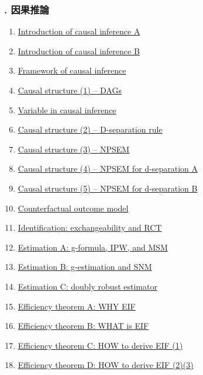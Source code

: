 \documentclass[11pt]{article}
\begin{document}
\vspace{-1cm}

\subsubsection*{. 因果推論}

\vspace{-0.5cm}

\begin{enumerate}
	\item \href{https://mp.weixin.qq.com/s/W92ZurwB0431bOjolErMcQ}{Introduction of causal inference A}	%
	\item \href{https://mp.weixin.qq.com/s/8R9Tew3wshkK_95TIfNQeQ}{Introduction of causal inference B}	%
	\item \href{https://mp.weixin.qq.com/s/2LjJU_2HnIQuVikL2nJGXQ}{Framework of causal inference}	%
	\item \href{https://mp.weixin.qq.com/s/9-aAIHYw7cIScdiZkmyDjg}{Causal structure (1) – DAGs}	%
	\item \href{https://mp.weixin.qq.com/s/3gdqkn7SgzBf1jzQX-cfxw}{Variable in causal inference}	%
	\item \href{https://mp.weixin.qq.com/s/anf-w03I-eiUCfSy7jaYDg}{Causal structure (2) – D-separation rule}	%
	\item \href{https://mp.weixin.qq.com/s/3ko1L3dg_2_z7cvpI02Gsw}{Causal structure (3) – NPSEM}	%
	\item \href{https://mp.weixin.qq.com/s/Mld8h9U1qgeg_myPnbYTbQ}{Causal structure (4) – NPSEM for d-separation A}	%
	\item \href{https://mp.weixin.qq.com/s/ZooQicl91QtUglL867KPsw}{Causal structure (5) – NPSEM for d-separation B}	%
	\item \href{https://mp.weixin.qq.com/s/1s1W5jLFTNFEBXbC1pMNqw}{Counterfactual outcome model}	%
	\item \href{https://mp.weixin.qq.com/s/L0rovGlXJF78IuaPsQBb4g}{Identification: exchangeability and RCT}	%
	\item \href{https://mp.weixin.qq.com/s/czrPh4QeGfloK0C8HwkDoA}{Estimation A: g-formula, IPW, and MSM}	%
	\item \href{https://mp.weixin.qq.com/s/VhO4AD5lIPQtHEbFsDBKSw}{Estimation B: g-estimation and SNM}	%
	\item \href{https://mp.weixin.qq.com/s/byaU2Ja7p2fipSJBPZhFhw}{Estimation C: doubly robust estimator}	%
	\item \href{https://mp.weixin.qq.com/s/K68QFvy2kBbAZg7P0mipeA}{Efficiency theorem A: WHY EIF}	%
	\item \href{https://mp.weixin.qq.com/s/tVgr9wOWmP8Uuami5H_PkA}{Efficiency theorem B: WHAT is EIF}	%
	\item \href{https://mp.weixin.qq.com/s/VtDcsaEEdxR1yZmdz9eB-g}{Efficiency theorem C: HOW to derive EIF (1)}	%
	\item \href{https://mp.weixin.qq.com/s/r7wr1zonO-GGEGyVyLxWQA}{Efficiency theorem D: HOW to derive EIF (2)(3)}	%
\end{enumerate}
\end{document}
